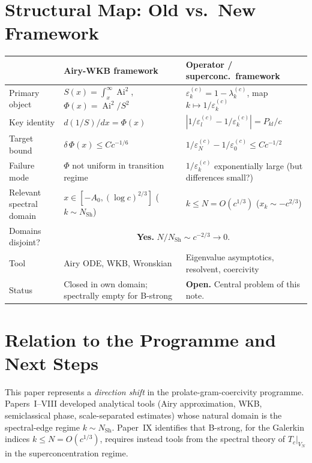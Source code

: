 \documentclass[12pt,a4paper]{article}
\newcommand{\Ai}{\operatorname{Ai}}
\newcommand{\lam}[1]{\lambda_{#1}^{(c)}}
\newcommand{\eps}[1]{\varepsilon_{#1}^{(c)}}
\newcommand{\Tc}{T_c}
\newcommand{\VN}{V_N}
\begin{document}
\section{Structural Map: Old vs.\ New Framework}
\label{sec:map}

\begin{center}
\renewcommand{\arraystretch}{1.5}
\begin{tabular}{p{3.5cm} p{4.5cm} p{4.5cm}}
\toprule
& \textbf{Airy-WKB framework}
& \textbf{Operator / superconc.\ framework} \\
\midrule
Primary object
& $S(x) = \int_x^\infty \Ai^2$, $\Phi(x) = \Ai^2/S^2$
& $\eps{k} = 1 - \lam{k}$, map $k \mapsto 1/\eps{k}$ \\
Key identity
& $d(1/S)/dx = \Phi(x)$
& $|1/\eps{l} - 1/\eps{k}| = P_{kl}/c$ \\
Target bound
& $\delta\,\Phi(x) \leq Cc^{-1/6}$
& $1/\eps{N} - 1/\eps{0} \leq Cc^{-1/2}$ \\
Failure mode
& $\Phi$ not uniform in transition regime
& $1/\eps{k}$ exponentially large (but differences small?) \\
Relevant spectral domain
& $x \in [-A_0, (\log c)^{2/3}]$ ($k \sim N_{\mathrm{Sh}}$)
& $k \leq N = O(c^{1/3})$ ($x_k \sim -c^{2/3}$) \\
Domains disjoint?
& \multicolumn{2}{c}{\textbf{Yes.} $N/N_{\mathrm{Sh}} \sim c^{-2/3} \to 0$.} \\
Tool
& Airy ODE, WKB, Wronskian
& Eigenvalue asymptotics, resolvent, coercivity \\
Status
& Closed in own domain; spectrally empty for B-strong
& \textbf{Open.} Central problem of this note. \\
\bottomrule
\end{tabular}
\end{center}

\section{Relation to the Programme and Next Steps}
\label{sec:next}

This paper represents a \emph{direction shift} in the
prolate-gram-coercivity programme.
Papers~I--VIII developed analytical tools
(Airy approximation, WKB, semiclassical phase,
scale-separated estimates) whose natural domain
is the spectral-edge regime $k \sim N_{\mathrm{Sh}}$.
Paper~IX identifies that B-strong, for the Galerkin
indices $k \leq N = O(c^{1/3})$, requires instead
tools from the spectral theory of
$\Tc|_{\VN}$ in the superconcentration regime.
\end{document}
